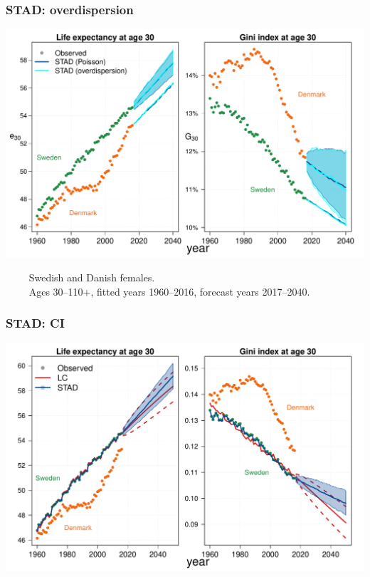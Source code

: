 \documentclass[12pt, xcolor=table]{beamer}  %
\begin{document}
\begin{frame}[noframenumbering]\frametitle{STAD: overdispersion}

\vspace{-0.5cm}
	
	\begin{center}	
		\vspace{0.4cm}
		
		\includegraphics[scale=.42]{Figures/Ch2/OVERDISP2}
		
	\end{center}

\vspace{-0.3cm}
\tiny{$\quad\quad$ Swedish and Danish females. \\ $\quad\quad$ Ages 30--110+, fitted years 1960--2016, forecast years 2017--2040.}

	
\end{frame}

\begin{frame}[noframenumbering]\frametitle{STAD: CI}

\vspace{-0.5cm}

	
	\begin{center}	
		\vspace{0.2cm}
		
		\includegraphics[scale=.42]{Figures/Ch2/F5_1}
		
	\end{center}
	
\end{frame}
\end{document}
